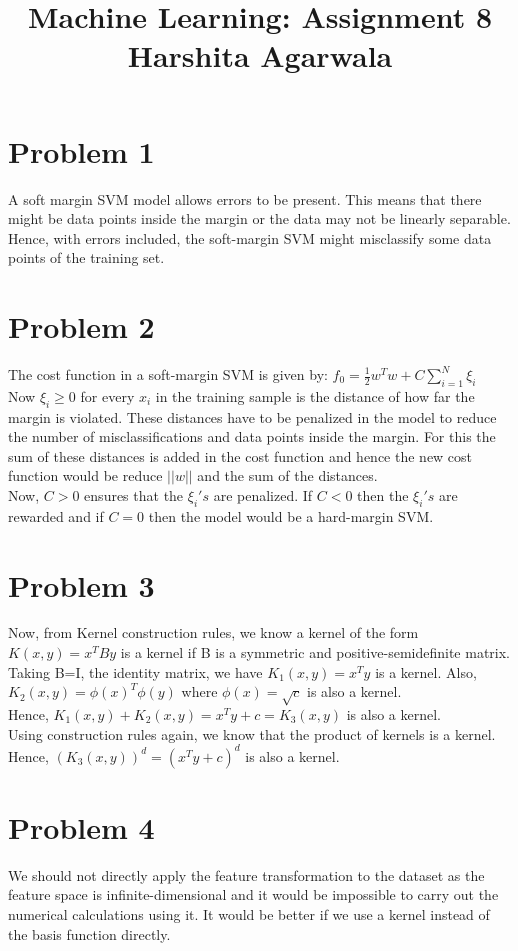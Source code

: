 \documentclass[10pt, a4paper, fleqn]{article}
\begin{document}
\title{Machine Learning: Assignment 8\\
Harshita Agarwala}
\maketitle
\section{Problem 1}
A soft margin SVM model allows errors to be present. This means that there might be data points inside the margin or the data may not be linearly separable.\\ Hence, with errors included, the soft-margin SVM might misclassify some data points of the training set.
\section{Problem 2}
The cost function in a soft-margin SVM is given by: $f_0 = \frac{1}{2} w^Tw + C\sum\limits_{i=1}^{N}{\xi_i}$\\
Now $\xi_i \geq 0$ for every $x_i$ in the training sample is the distance of how far the margin is violated. These distances have to be penalized in the model to reduce the number of misclassifications and data points inside the margin. For this the sum of these distances is added in the cost function and hence the new cost function would be reduce $||w||$ and the sum of the distances. \\
Now, $C>0$ ensures that the $\xi_i's$ are penalized. If $C<0$ then the $\xi_i's$ are rewarded and if $C=0$ then the model would be a hard-margin SVM.  
\section{Problem 3}
Now, from Kernel construction rules, we know a kernel of the form $K(x,y) = x^TBy$ is a kernel if B is a symmetric and positive-semidefinite matrix. Taking B=I, the identity matrix, we have $K_1(x,y) = x^Ty$ is a kernel. Also, \\$K_2(x,y)=\phi(x)^T\phi(y)$ where $\phi(x) = \sqrt{c}$ is also a kernel.\\
Hence, $K_1(x,y)+K_2(x,y) = x^Ty+c = K_3(x,y)$ is also a kernel.\\
Using construction rules again, we know that the product of kernels is a kernel. Hence, $(K_3(x,y))^d = (x^Ty + c)^d$ is also a kernel.
\section{Problem 4}
We should not directly apply the feature transformation to the dataset as the feature space is infinite-dimensional and it would be impossible to carry out the numerical calculations using it. It would be better if we use a kernel instead of the basis function directly.
\end{document}

